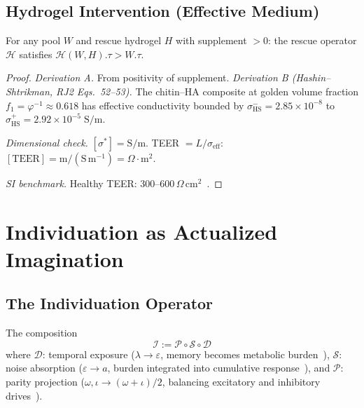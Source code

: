 \subsection{Hydrogel Intervention (Effective Medium)}

\begin{theorem}
For any pool $W$ and rescue hydrogel $H$ with supplement $> 0$:
the rescue operator $\mathcal{H}$ satisfies
$\mathcal{H}(W, H).\tau > W.\tau$.

\begin{proof}
\emph{Derivation A.} From positivity of supplement.
\emph{Derivation B (Hashin--Shtrikman, RJ2 Eqs.~52--53).}
The chitin--HA composite at golden volume fraction $f_1 = \varphi^{-1} \approx 0.618$
has effective conductivity bounded by
$\sigma^-_\mathrm{HS} = 2.85\times10^{-8}$ to
$\sigma^+_\mathrm{HS} = 2.92\times10^{-5}\;\mathrm{S/m}$.

\emph{Dimensional check.} $[\sigma^*] = \mathrm{S/m}$. TEER $= L/\sigma_\mathrm{eff}$:
$[\mathrm{TEER}] = \mathrm{m/(S\,m^{-1})} = \Omega\cdot\mathrm{m}^2$. \checkmark

\emph{SI benchmark.}
Healthy TEER: 300--600\,$\Omega$\,cm$^2$~\cite{srinivasan15}.
\qedhere
\end{proof}
\end{theorem}

\section{Individuation as Actualized Imagination}

\subsection{The Individuation Operator}

\begin{definition}[Individuation]
The composition
\begin{equation}
  \mathcal{I} := \mathcal{P} \circ \mathcal{S} \circ \mathcal{D}
\end{equation}
where $\mathcal{D}$: temporal exposure ($\lambda \to \varepsilon$,
memory becomes metabolic burden~\cite{lc}),
$\mathcal{S}$: noise absorption ($\varepsilon \to a$,
burden integrated into cumulative response~\cite{lc}), and
$\mathcal{P}$: parity projection ($\omega, \iota \to (\omega+\iota)/2$,
balancing excitatory and inhibitory drives~\cite{dwm}).
\end{definition}

